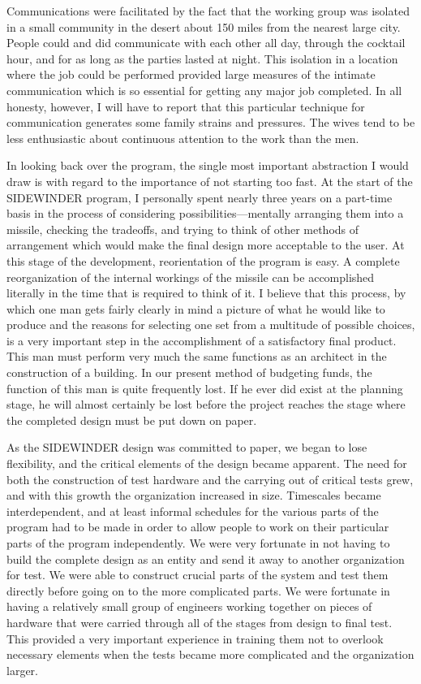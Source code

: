 \documentclass{memoir}
\begin{document}
Communications were facilitated by the fact that the working group was isolated in a small community in the desert about 150 miles from the nearest large city. People could and did communicate with each other all day, through the cocktail hour, and for as long as the parties lasted at night. This isolation in a location where the job could be performed provided large measures of the intimate communication which is so essential for getting any major job completed. In all honesty, however, I will have to report that this particular technique for communication generates some family strains and pressures. The wives tend to be less enthusiastic about continuous attention to the work than the men.

In looking back over the program, the single most important abstraction I would draw is with regard to the importance of not starting too fast. At the start of the SIDEWINDER program, I personally spent nearly three years on a part-time basis in the process of considering possibilities---mentally arranging them into a missile, checking the tradeoffs, and trying to think of other methods of arrangement which would make the final design more acceptable to the user. At this stage of the development, reorientation of the program is easy. A complete reorganization of the internal workings of the missile can be accomplished literally in the time that is required to think of it. I believe that this process, by which one man gets fairly clearly in mind a picture of what he would like to produce and the reasons for selecting one set from a multitude of possible choices, is a very important step in the accomplishment of a satisfactory final product. This man must perform very much the same functions as an architect in the construction of a building. In our present method of budgeting funds, the function of this man is quite frequently lost. If he ever did exist at the planning stage, he will almost certainly be lost before the project reaches the stage where the completed design must be put down on paper.

As the SIDEWINDER design was committed to paper, we began to lose flexibility, and the critical elements of the design became apparent. The need for both the construction of test hardware and the carrying out of critical tests grew, and with this growth the organization increased in size. Timescales became interdependent, and at least informal schedules for the various parts of the program had to be made in order to allow people to work on their particular parts of the program independently. We were very fortunate in not having to build the complete design as an entity and send it away to another organization for test. We were able to construct crucial parts of the system and test them directly before going on to the more complicated parts. We were fortunate in having a relatively small group of engineers working together on pieces of hardware that were carried through all of the stages from design to final test. This provided a very important experience in training them not to overlook necessary elements when the tests became more complicated and the organization larger.
\end{document}
